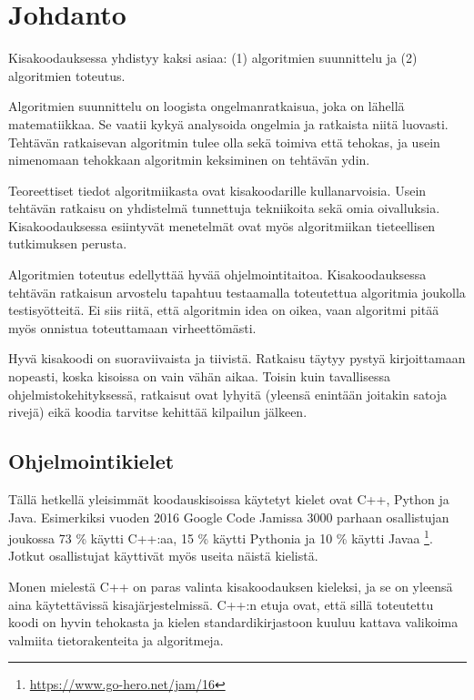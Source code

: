 \chapter{Johdanto}

Kisakoodauksessa yhdistyy kaksi asiaa:
(1) algoritmien suunnittelu ja
(2) algoritmien toteutus.

Algoritmien suunnittelu on loogista ongelmanratkaisua,
joka on lähellä matematiikkaa.
Se vaatii kykyä analysoida ongelmia ja
ratkaista niitä luovasti.
Tehtävän ratkaisevan algoritmin tulee olla sekä
toimiva että tehokas,
ja usein nimenomaan tehokkaan algoritmin
keksiminen on tehtävän ydin.

Teoreettiset tiedot algoritmiikasta
ovat kisakoodarille kullanarvoisia.
Usein tehtävän ratkaisu on yhdistelmä tunnettuja
tekniikoita sekä omia oivalluksia.
Kisakoodauksessa esiintyvät menetelmät ovat myös
algoritmiikan tieteellisen tutkimuksen perusta.

Algoritmien toteutus edellyttää hyvää ohjelmointitaitoa.
Kisakoodauksessa tehtävän ratkaisun arvostelu tapahtuu
testaamalla toteutettua algoritmia
joukolla testisyötteitä.
Ei siis riitä, että algoritmin idea on oikea,
vaan algoritmi pitää myös onnistua toteuttamaan virheettömästi.

Hyvä kisakoodi on suoraviivaista ja tiivistä.
Ratkaisu täytyy pystyä kirjoittamaan nopeasti,
koska kisoissa on vain vähän aikaa.
Toisin kuin tavallisessa ohjelmistokehityksessä,
ratkaisut ovat lyhyitä
(yleensä enintään joitakin satoja rivejä)
eikä koodia tarvitse kehittää kilpailun jälkeen.



\section{Ohjelmointikielet}


Tällä hetkellä yleisimmät koodauskisoissa
käytetyt kielet ovat C++, Python ja Java.
Esimerkiksi vuoden 2016 Google Code Jamissa
3000 parhaan osallistujan joukossa
73 \% käytti C++:aa,
15 \% käytti Pythonia ja
10 \% käytti Javaa \footnote{\url{https://www.go-hero.net/jam/16}}.
Jotkut osallistujat käyttivät myös useita näistä kielistä.

Monen mielestä C++ on paras
valinta kisakoodauksen kieleksi,
ja se on yleensä aina käytettävissä
kisajärjestelmissä.
C++:n etuja ovat, että sillä
toteutettu koodi on hyvin tehokasta
ja kielen standardikirjastoon
kuuluu kattava valikoima valmiita
tietorakenteita ja algoritmeja.

